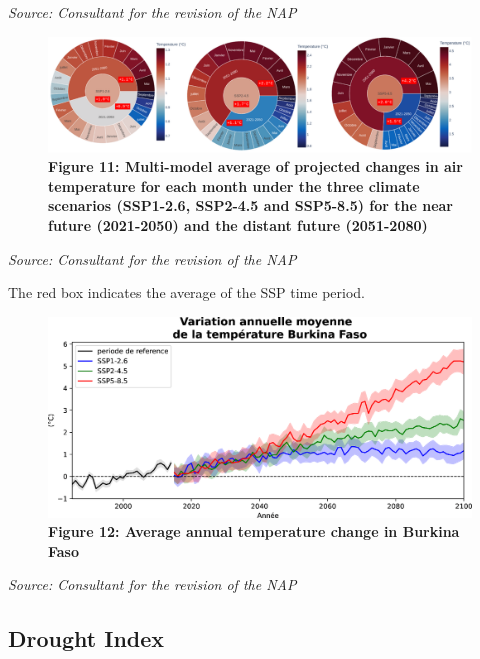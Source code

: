 \documentclass[
]{book}
\begin{document}
\emph{Source: Consultant for the revision of the NAP}

\begin{figure}
\centering
\includegraphics{Figures and Photos/Figure 11.png}
\caption{\textbf{Figure 11: Multi-model average of projected changes in air temperature for each month under the three climate scenarios (SSP1-2.6, SSP2-4.5 and SSP5-8.5) for the near future (2021-2050) and the distant future (2051-2080)}}
\end{figure}

\emph{Source: Consultant for the revision of the NAP}

The red box indicates the average of the SSP time period.

\begin{figure}
\centering
\includegraphics{Figures and Photos/Figure 12.png}
\caption{\textbf{Figure 12: Average annual temperature change in Burkina Faso}}
\end{figure}

\emph{Source: Consultant for the revision of the NAP}

\subsection{Drought Index}\label{drought-index}
\end{document}

